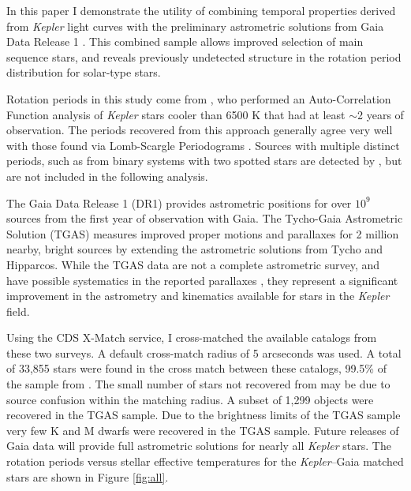 \documentclass[manuscript, letterpaper]{aastex6}
\makeatletter
\let\origsection\section
\renewcommand\section{\@ifstar{\starsection}{\nostarsection}}
\newcommand\nostarsection[1]{\sectionprelude\origsection{#1}}
\newcommand\starsection[1]{\sectionprelude\origsection*{#1}}
\newcommand\sectionprelude{\vspace{1em}}
\newcommand{\Kepler}{\textsl{Kepler}\xspace}
\makeatother
\begin{document}
In this paper I demonstrate the utility of combining temporal properties derived from \Kepler light curves with the preliminary astrometric solutions from  Gaia Data Release 1 \citep[hereafter DR1][]{gaia_dr1}. This combined sample allows improved selection of main sequence stars, and reveals previously undetected structure in the rotation period distribution for solar-type stars.




\section{The \Kepler--Gaia Data}
Rotation periods in this study come from \citet{mcquillan2014}, who performed an Auto-Correlation Function analysis of \Kepler stars cooler than 6500 K that had at least $\sim$2 years of observation. The periods recovered from this approach generally agree very well with those found via Lomb-Scargle Periodograms \citep[e.g.][]{reinhold2013,aigrain2015}. Sources with multiple distinct periods, such as from binary systems with two spotted stars \citep[e.g.][]{lurie2015} are detected by \citet{mcquillan2014}, but are not included in the following analysis.

The Gaia Data Release 1 (DR1) provides astrometric positions for over $10^9$ sources from the first year of observation with Gaia. The Tycho-Gaia Astrometric Solution (TGAS) measures improved proper motions and parallaxes for 2 million nearby, bright sources by extending the astrometric solutions from Tycho and Hipparcos. While the TGAS data are not a complete astrometric survey, and have possible systematics in the reported parallaxes \citep{gaia_dr1,stassun2016}, they represent a significant improvement in the astrometry and kinematics available for stars in the \Kepler field.


Using the CDS X-Match service, I cross-matched the available catalogs from these two surveys. A default cross-match radius of 5 arcseconds was used. A total of 33,855 stars were found in the cross match between these catalogs, 99.5\% of the sample from \citet{mcquillan2014}. The small number of stars not recovered from \citet{mcquillan2014} may be due to source confusion within the matching radius. A subset of 1,299 objects were recovered in the TGAS sample. Due to the brightness limits of the TGAS sample very few K and M dwarfs were recovered in the TGAS sample. Future releases of Gaia data will provide full astrometric solutions for nearly all \Kepler stars. The rotation periods versus stellar effective temperatures for the \Kepler--Gaia matched stars are shown in Figure \ref{fig:all}. 
\end{document}
